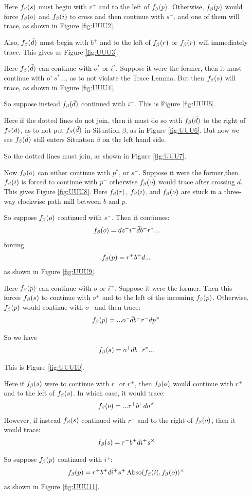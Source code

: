 Here $f_\beta(s)$ must begin with $r^+$ and to the left of $f_\beta(p)$. Otherwise, $f_\beta(p)$ would force $f_\beta(o)$ and $f_\beta(i)$ to cross and then continue with $s^-$, and one of them will trace, as shown in Figure \ref{fig:UUU2}.

Also, $f_\beta(\bar{d})$ must begin with $b^+$ and to the left of $f_\beta(r)$ or $f_\beta(r)$ will immediately trace. This gives us Figure \ref{fig:UUU3}.

Here $f_\beta(\bar{d})$ can continue with $o^*$ or $i^*$. Suppose it were the former, then it must continue with $o^+ s^*...$, as to not violate the Trace Lemma. But then $f_\beta(s)$ will trace, as shown in Figure \ref{fig:UUU4}.

So suppose instead $f_\beta(\bar{d})$ continued with $i^+$. This is Figure \ref{fig:UUU5}. 

Here if the dotted lines do not join, then it must do so with $f_\beta(\bar{d})$ to the right of $f_\beta(d)$, as to not put $f_\beta(\bar{d})$ in Situation $\beta$, as in Figure \ref{fig:UUU6}. But now we see $f_\beta(\bar{d})$ still enters Situation $\beta$ on the left hand side.

So the dotted lines must join, as shown in Figure \ref{fig:UUU7}.

Now $f_\beta(o)$ can either continue with $p^*$, or $s^-$. Suppose it were the former,then $f_\beta(i)$ is forced to continue with $p^-$ otherwise $f_\beta(o)$ would trace after crossing $d$. This gives Figure \ref{fig:UUU8}. Here $f_\beta(r)$, $f_\beta(i)$, and $f_\beta(o)$ are stuck in a three-way clockwise path mill between $b$ and $p$.

So suppose $f_\beta(o)$ continued with $s^-$. Then it continues:
\[
f_\beta(o) = d s^- i^- \bar{d} b^- r^*...
\]
forcing
\[
f_\beta(p) = r^+ b^+ d...
\]
as shown in Figure \ref{fig:UUU9}.

Here $f_\beta(p)$ can continue with $o$ or $i^+$. Suppose it were the former. Then this forces $f_\beta(s)$ to continue with $o^+$ and to the left of the incoming $f_\beta(p)$. Otherwise, $f_\beta(p)$ would continue with $o^-$ and then trace:
\[
f_\beta(p) = ...o^- \bar{d} b^- r^- d p^\times
\]

So we have
\[
f_\beta(s) = o^+ \bar{d} b^- r^*...
\]

This is Figure \ref{fig:UUU10}.

Here if $f_\beta(s)$ were to continue with $r^\circ$ or $r^+$, then $f_\beta(o)$ would continue with $r^+$ and to the left of $f_\beta(s)$. In which case, it would trace:
\[
f_\beta(o) = ...r^+ b^+ d o^\times
\]
However, if instead $f_\beta(s)$ continued with $r^-$ and to the right of $f_\beta(o)$, then it would trace:
\[
f_\beta(s) = r^- b^+ d i^+ s^\times
\]

So suppose $f_\beta(p)$ continued with $i^+$:
\[
f_\beta(p) = r^+ b^+ d \hat{i}^+ s^+ \operatorname{Abso}(f_\beta(i), f_\beta(o))^\times
\]
as shown in Figure \ref{fig:UUU11}.

